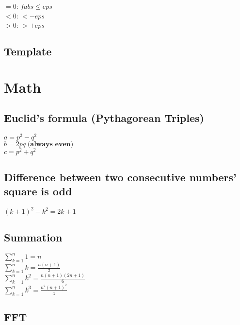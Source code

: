 \documentclass[10pt,oneside]{article}
\begin{document}
\begin{landscape}
\begin{multicols}{2}

$=0$: $fabs \leq eps$\\
$<0$: $ < -eps$\\
$>0$: $ > +eps$

\subsection{Template}

% 


\section{Math}

\subsection{Euclid's formula (Pythagorean Triples)}

$a = p^2 - q^2 $\\
$b = 2pq \; \textbf{(always even)}$ \\
$c = p^2 + q^2$\\

\subsection{Difference between two consecutive numbers' square is odd}

$(k + 1)^2 - k^2 = 2k + 1$

\subsection{Summation}

$\sum_{k=1}^{n} 1= n$\\
$\sum_{k=1}^{n} k= \frac{n(n+1)}{2}$\\
$\sum_{k=1}^{n} k^2= \frac{n(n+1)(2n+1)}{6}$\\
$\sum_{k=1}^{n} k^3= \frac{n^2(n+1)^2}{4}$\\

\subsection{FFT}



\end{multicols}
\end{landscape}
\end{document}

